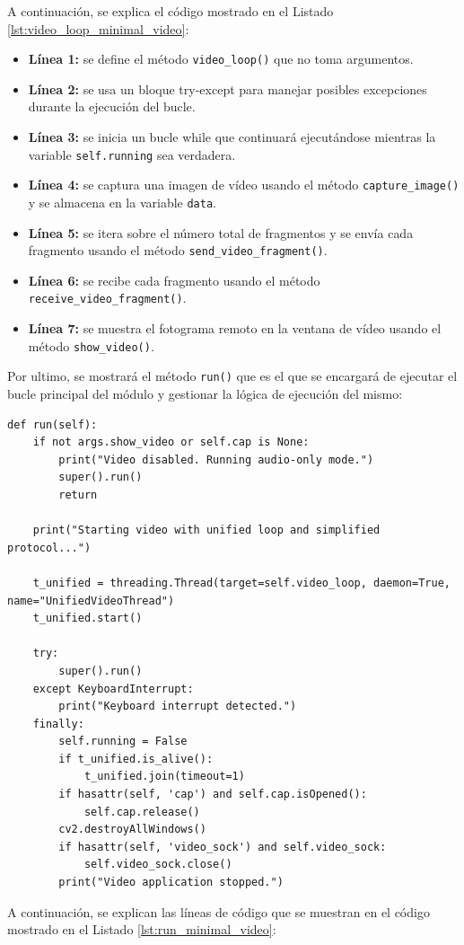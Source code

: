\vspace{\baselineskip}
A continuación, se explica el código mostrado en el Listado \ref{lst:video_loop_minimal_video}:
\vspace{\baselineskip}
\begin{itemize}
    \item \textbf{Línea 1:} se define el método \texttt{video\_loop()} que no toma argumentos.
    \item \textbf{Línea 2:} se usa un bloque try-except para manejar posibles excepciones durante la ejecución del bucle.
    \item \textbf{Línea 3:} se inicia un bucle while que continuará ejecutándose mientras la variable \texttt{self.running} sea verdadera.
    \item \textbf{Línea 4:} se captura una imagen de vídeo usando el método \texttt{capture\_image()} y se almacena en la variable \texttt{data}.
    \item \textbf{Línea 5:} se itera sobre el número total de fragmentos y se envía cada fragmento usando el método \texttt{send\_video\_fragment()}.
    \item \textbf{Línea 6:} se recibe cada fragmento usando el método \texttt{receive\_video\_fragment()}.
    \item \textbf{Línea 7:} se muestra el fotograma remoto en la ventana de vídeo usando el método \texttt{show\_video()}.
\end{itemize}

\vspace{\baselineskip}

Por ultimo, se mostrará el método \texttt{run()} que es el que se encargará de ejecutar el bucle principal del módulo y gestionar la lógica de ejecución del mismo:
\begin{lstlisting}[style=pythonstyle, caption={Método \texttt{run()} de \textit{Minimal\_Video}.}, label={lst:run_minimal_video}]
def run(self):
    if not args.show_video or self.cap is None:
        print("Video disabled. Running audio-only mode.")
        super().run()
        return

    print("Starting video with unified loop and simplified protocol...")

    t_unified = threading.Thread(target=self.video_loop, daemon=True, name="UnifiedVideoThread")
    t_unified.start()

    try:
        super().run()
    except KeyboardInterrupt:
        print("Keyboard interrupt detected.")
    finally:
        self.running = False
        if t_unified.is_alive():
            t_unified.join(timeout=1)
        if hasattr(self, 'cap') and self.cap.isOpened():
            self.cap.release()
        cv2.destroyAllWindows()
        if hasattr(self, 'video_sock') and self.video_sock:
            self.video_sock.close()
        print("Video application stopped.")
\end{lstlisting}
\vspace{\baselineskip}
A continuación, se explican las líneas de código que se muestran en el código mostrado en el Listado \ref{lst:run_minimal_video}:

